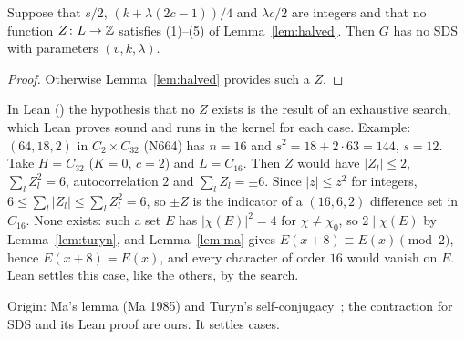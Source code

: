 \begin{theorem}\label{thm:z32}
Suppose that $s/2$, $(k + \lambda(2c-1))/4$ and $\lambda c/2$ are integers and that no function
$Z \colon L \to \mathbb{Z}$ satisfies (1)--(5) of Lemma~\ref{lem:halved}. Then $G$ has no SDS with
parameters $(v,k,\lambda)$.
\end{theorem}

\begin{proof}
Otherwise Lemma~\ref{lem:halved} provides such a $Z$.
\end{proof}

\begin{remark}\label{rem:z32}
In Lean () the hypothesis that no $Z$
exists is the result of an exhaustive search, which Lean proves sound and runs in the kernel for
each case. Example: $(64,18,2)$ in $C_2 \times C_{32}$ (N664) has $n = 16$ and $s^2 = 18 + 2 \cdot
63 = 144$, $s = 12$. Take $H = C_{32}$ ($K = 0$, $c = 2$) and $L = C_{16}$. Then $Z$ would have
$|Z_l| \le 2$, $\sum_l Z_l^2 = 6$, autocorrelation $2$ and $\sum_l Z_l = \pm 6$. Since $|z| \le
z^2$ for integers, $6 \le \sum_l |Z_l| \le \sum_l Z_l^2 = 6$, so $\pm Z$ is the indicator of a
$(16,6,2)$ difference set in $C_{16}$. None exists: such a set $E$ has $|\chi(E)|^2 = 4$ for
$\chi \ne \chi_0$, so $2 \mid \chi(E)$ by Lemma~\ref{lem:turyn}, and Lemma~\ref{lem:ma} gives
$E(x+8) \equiv E(x) \pmod 2$, hence $E(x+8) = E(x)$, and every character of order $16$ would
vanish on $E$. Lean settles this case, like the others, by the search.

Origin: Ma's lemma (Ma 1985) and Turyn's self-conjugacy~\cite{turyn}; the contraction for SDS and
its Lean proof are ours. It settles  cases.
\end{remark}
